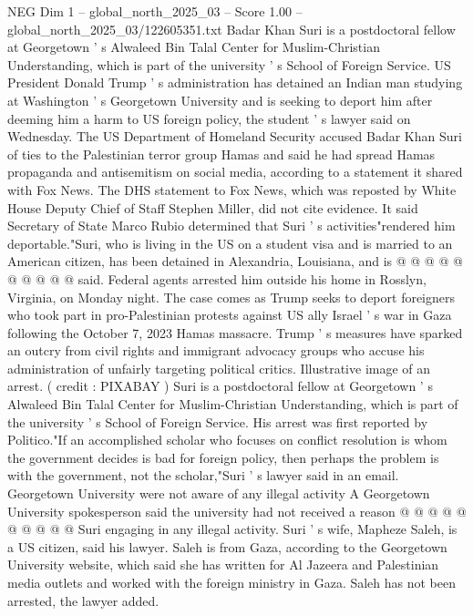 \begin{textsample}{NEG Dim 1 – global\_north\_2025\_03 – Score 1.00 – global\_north\_2025\_03/122605351.txt}  \label{ex:f1_neg_054}
Badar Khan Suri is a postdoctoral fellow at Georgetown ' s Alwaleed Bin Talal Center for Muslim-Christian Understanding, which is part of the university ' s School of Foreign Service.
US President Donald Trump ' s administration has detained an Indian man studying at Washington ' s Georgetown University and is seeking to deport him after deeming him a harm to US foreign policy, the student ' s lawyer said on Wednesday.
The US Department of Homeland Security accused Badar Khan Suri of ties to the Palestinian terror group Hamas and said he had spread Hamas propaganda and antisemitism on social media, according to a statement it shared with Fox News.
The DHS statement to Fox News, which was reposted by White House Deputy Chief of Staff Stephen Miller, did not cite evidence.
It said Secretary of State Marco Rubio determined that Suri ' s activities"rendered him deportable."Suri, who is living in the US on a student visa and is married to an American citizen, has been detained in Alexandria, Louisiana, and is @ @ @ @ @ @ @ @ @ @ said.
Federal agents arrested him outside his home in Rosslyn, Virginia, on Monday night.
The case comes as Trump seeks to deport foreigners who took part in pro-Palestinian protests against US ally Israel ' s war in Gaza following the October 7, 2023 Hamas massacre.
Trump ' s measures have sparked an outcry from civil rights and immigrant advocacy groups who accuse his administration of unfairly targeting political critics.
Illustrative image of an arrest. ( credit : PIXABAY ) Suri is a postdoctoral fellow at Georgetown ' s Alwaleed Bin Talal Center for Muslim-Christian Understanding, which is part of the university ' s School of Foreign Service.
His arrest was first reported by Politico."If an accomplished scholar who focuses on conflict resolution is whom the government decides is bad for foreign policy, then perhaps the problem is with the government, not the scholar,"Suri ' s lawyer said in an email.
Georgetown University were not aware of any illegal activity A Georgetown University spokesperson said the university had not received a reason @ @ @ @ @ @ @ @ @ @ Suri engaging in any illegal activity.
Suri ' s wife, Mapheze Saleh, is a US citizen, said his lawyer.
Saleh is from Gaza, according to the Georgetown University website, which said she has written for Al Jazeera and Palestinian media outlets and worked with the foreign ministry in Gaza.
Saleh has not been arrested, the lawyer added.

\end{textsample}
